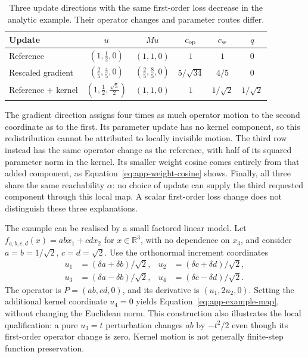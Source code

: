 \documentclass{article}
\theoremstyle{definition}
\theoremstyle{remark}
\begin{document}
\begin{table}[t]
\centering\small
\caption{Three update directions with the same first-order loss decrease in the analytic example. Their operator changes and parameter routes differ.}
\label{tab:app-example}
\begin{tabular}{lccccc}
\toprule
Update & $u$ & $Mu$ & $c_{\rm op}$ & $c_{\rm w}$ & $q$\\
\midrule
Reference & $(1,\tfrac12,0)$ & $(1,1,0)$ & $1$ & $1$ & $0$\\
Rescaled gradient & $(\tfrac25,\tfrac45,0)$ & $(\tfrac25,\tfrac85,0)$
 & $5/\sqrt{34}$ & $4/5$ & $0$\\
Reference + kernel & $(1,\tfrac12,\tfrac{\sqrt5}{2})$ & $(1,1,0)$
 & $1$ & $1/\sqrt2$ & $1/\sqrt2$\\
\bottomrule
\end{tabular}
\end{table}

The gradient direction assigns four times as much operator motion to the second coordinate as to the first. Its parameter update has no kernel component, so this redistribution cannot be attributed to locally invisible motion. The third row instead has the same operator change as the reference, with half of its squared parameter norm in the kernel. Its smaller weight cosine comes entirely from that added component, as Equation~\eqref{eq:app-weight-cosine} shows. Finally, all three share the same reachability $\alpha$: no choice of update can supply the third requested component through this local map. A scalar first-order loss change does not distinguish these three explanations.

The example can be realised by a small factored linear model. Let $f_{a,b,c,d}(x)=abx_1+cdx_2$ for $x\in\mathbb R^3$, with no dependence on $x_3$, and consider $a=b=1/\sqrt2$, $c=d=\sqrt2$. Use the orthonormal increment coordinates
\begin{equation}
 \begin{aligned}
 u_1&=(\delta a+\delta b)/\sqrt2,&
 u_2&=(\delta c+\delta d)/\sqrt2,\\
 u_3&=(\delta a-\delta b)/\sqrt2,&
 u_4&=(\delta c-\delta d)/\sqrt2.
 \end{aligned}
\end{equation}
The operator is $P=(ab,cd,0)$, and its derivative is $(u_1,2u_2,0)$. Setting the additional kernel coordinate $u_4=0$ yields Equation~\eqref{eq:app-example-map}, without changing the Euclidean norm. This construction also illustrates the local qualification: a pure $u_3=t$ perturbation changes $ab$ by $-t^2/2$ even though its first-order operator change is zero. Kernel motion is not generally finite-step function preservation.
\end{document}
